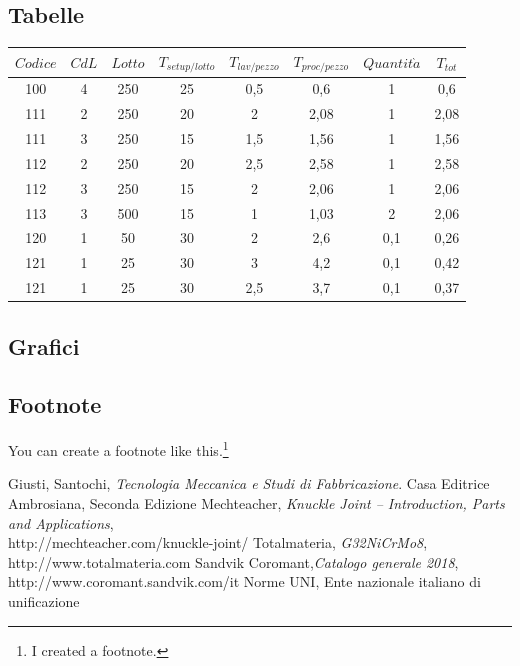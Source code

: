 \documentclass{FR16}
\begin{document}
\subsection{Tabelle}
\begin{center}
\begin{tabular}{c c c c c c c c}
\arrayrulecolor{Azzurro}
\hline
{\bfseries $Codice$} & {\bfseries $CdL$} & {\bfseries $Lotto$} & {\bfseries $T_{setup/lotto}$} & {\bfseries $T_{lav/pezzo}$} & {\bfseries $T_{proc/pezzo}$} & {\bfseries$Quantit\grave{a}$} & {\bfseries $T_{tot}$}\\
\hline
100 & 4 & 250 & 25 & 0,5 & 0,6 & 1 & 0,6\\
111 & 2 & 250 & 20 & 2 & 2,08 & 1 & 2,08 \\
111 & 3 & 250 & 15 & 1,5 & 1,56 & 1 & 1,56 \\
112 & 2 & 250 & 20 & 2,5 & 2,58 & 1 & 2,58 \\
112 & 3 & 250 & 15 & 2 & 2,06 & 1 & 2,06\\
113 & 3 & 500 & 15 & 1 & 1,03 & 2 & 2,06\\
120 & 1 & 50 & 30 & 2 & 2,6 & 0,1 & 0,26\\
121 & 1 & 25 & 30 & 3 & 4,2 & 0,1 & 0,42 \\
121 & 1 & 25 & 30 & 2,5 & 3,7 & 0,1 & 0,37 \\
\hline
\end{tabular}
\end{center}



\subsection{Grafici}
\begin{center}

\end{center}


\subsection{Footnote}
You can create a footnote like this.\footnote{I created a footnote.}



\newpage
\begin{thebibliography}{9}
Giusti, Santochi, \emph{Tecnologia Meccanica e Studi di Fabbricazione}. Casa Editrice Ambrosiana, Seconda Edizione
Mechteacher, \emph{Knuckle Joint – Introduction, Parts and Applications},\\ http://mechteacher.com/knuckle-joint/
Totalmateria, \emph{G32NiCrMo8}, http://www.totalmateria.com 
Sandvik Coromant,\emph{Catalogo  generale  2018},   http://www.coromant.sandvik.com/it
Norme UNI, Ente nazionale italiano di unificazione
\end{thebibliography}
\end{document}
